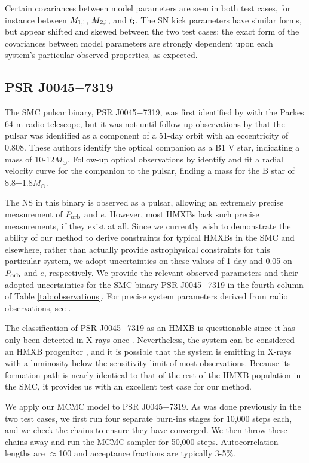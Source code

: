 \documentclass[usenatbib]{mnras}
\newcommand{\Msun}{\ifmmode {M_{\odot}}\else${M_{\odot}}$\fi}
\begin{document}
Certain covariances between model parameters are seen in both test cases, for instance between $M_{\rm 1,i}$, $M_{\rm 2,i}$, and $t_{\rm i}$. The SN kick parameters have similar forms, but appear shifted and skewed between the two test cases; the exact form of the covariances between model parameters are strongly dependent upon each system's particular observed properties, as expected. 


\subsection{PSR J0045$-$7319}

The SMC pulsar binary, PSR J0045$-$7319, was first identified by \citet{ables87} with the Parkes 64-m radio telescope, but it was not until follow-up observations by \citet{kaspi94} that the pulsar was identified as a component of a 51-day orbit with an eccentricity of 0.808. These authors identify the optical companion as a B1 V star, indicating a mass of 10-12\Msun. Follow-up optical observations by \citet{bell95} identify and fit a radial velocity curve for the companion to the pulsar, finding a mass for the B star of 8.8$\pm$1.8\Msun. 

The NS in this binary is observed as a pulsar, allowing an extremely precise measurement of $P_{\rm orb}$ and $e$. However, most HMXBs lack such precise measurements, if they exist at all. Since we currently wish to demonstrate the ability of our method to derive constraints for typical HMXBs in the SMC and elsewhere, rather than actually provide astrophysical constraints for this particular system, we adopt uncertainties on these values of 1 day and 0.05 on $P_{\rm orb}$ and $e$, respectively. We provide the relevant observed parameters and their adopted uncertainties for the SMC binary PSR J0045$-$7319 in the fourth column of Table \ref{tab:observations}. For precise system parameters derived from radio observations, see \citet{kaspi94}.

The classification of PSR J0045$-$7319 as an HMXB is questionable since it has only been detected in X-rays once \citep{galache08}. Nevertheless, the system can be considered an HMXB progenitor \citep{kaspi94}, and it is possible that the system is emitting in X-rays with a luminosity below the sensitivity limit of most observations. Because its formation path is nearly identical to that of the rest of the HMXB population in the SMC, it provides us with an excellent test case for our method.

We apply our MCMC model to PSR J0045$-$7319. As was done previously in the two test cases, we first run four separate burn-ins stages for 10,000 steps each, and we check the chains to ensure they have converged. We then throw these chains away and run the MCMC sampler for 50,000 steps. Autocorrelation lengths are $\approx$100 and acceptance fractions are typically 3-5\%. 
\end{document}
